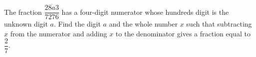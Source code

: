 The fraction $\dfrac{\overline{28a3}}{7276}$ has a four-digit numerator whose hundreds digit is the unknown digit $a$. Find the digit $a$ and the whole number $x$ such that subtracting $x$ from the numerator and adding $x$ to the denominator gives a fraction equal to $\dfrac{2}{7}$.
